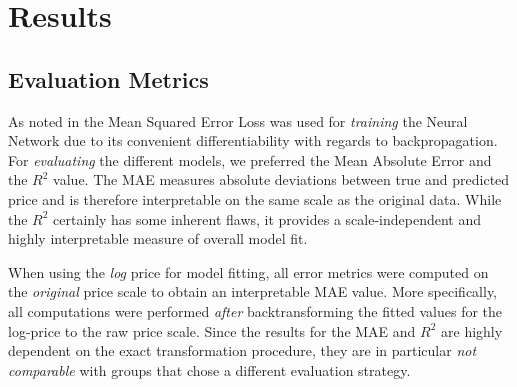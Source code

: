 \section{Results} \label{results}



\subsection{Evaluation Metrics}

As noted in  the Mean Squared Error Loss was used for \emph{training} the Neural Network due to its convenient differentiability with regards to backpropagation.
For \emph{evaluating} the different models, we preferred the Mean Absolute Error and the $R^2$ value.
The MAE measures absolute deviations between true and predicted price and is therefore interpretable on the same scale as the original data.
While the $R^2$ certainly has some inherent flaws, it provides a scale-independent and highly interpretable measure of overall model fit.

When using the \emph{log} price for model fitting, all error metrics were computed on the \emph{original} price scale to obtain an interpretable MAE value.
More specifically, all computations were performed \emph{after} backtransforming the fitted values for the log-price to the raw price scale.
Since the results for the MAE and $R^2$ are highly dependent on the exact transformation procedure, they are in particular \emph{not comparable} with groups that chose a different evaluation strategy.

